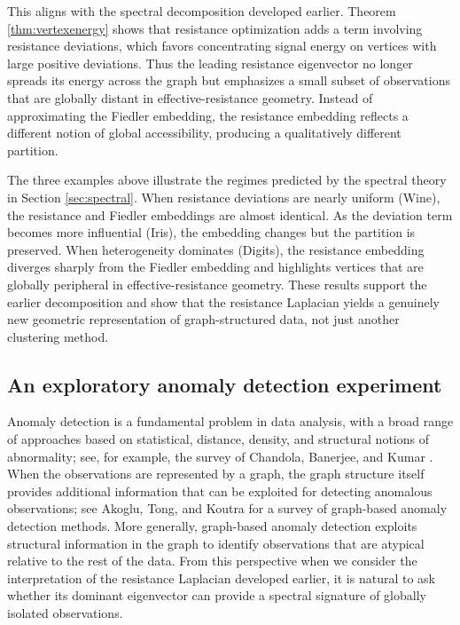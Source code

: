 \documentclass[12pt,a4paper]{amsart}
\theoremstyle{remark}
\theoremstyle{definition}
\newcommand{\1}{\mathbf{1}}
\newcommand{\0}{\mathbf{0}}
\begin{document}
This aligns with the spectral decomposition developed earlier. 
Theorem \ref{thm:vertexenergy} shows that resistance optimization adds a term involving resistance deviations, which favors concentrating signal energy on vertices with large positive deviations. 
Thus the leading resistance eigenvector no longer spreads its energy across the graph but emphasizes a small subset of observations that are globally distant in effective-resistance geometry. 
Instead of approximating the Fiedler embedding, the resistance embedding reflects a different notion of global accessibility, producing a qualitatively different partition.

The three examples above illustrate the regimes predicted by the spectral theory in Section \ref{sec:spectral}. 
When resistance deviations are nearly uniform (Wine), the resistance and Fiedler embeddings are almost identical. 
As the deviation term becomes more influential (Iris), the embedding changes but the partition is preserved. 
When heterogeneity dominates (Digits), the resistance embedding diverges sharply from the Fiedler embedding and highlights vertices that are globally peripheral in effective-resistance geometry. 
These results support the earlier decomposition and show that the resistance Laplacian yields a genuinely new geometric representation of graph-structured data, not just another clustering method.

\subsection{An exploratory anomaly detection experiment}
Anomaly detection is a fundamental problem in data analysis, with a broad range of approaches based on statistical, distance, density, and structural notions of abnormality; see, for example, the survey of Chandola, Banerjee, and Kumar \cite{Chandola2009}.
When the observations are represented by a graph, the graph structure itself provides additional information that can be exploited for detecting anomalous observations; see Akoglu, Tong, and Koutra \cite{Akoglu2015} for a survey of graph-based anomaly detection methods. 
More generally, graph-based anomaly detection exploits structural information in the graph to identify observations that are atypical relative to the rest of the data.
From this perspective when we consider the interpretation of the resistance Laplacian developed earlier, it is natural to ask whether its dominant eigenvector can provide a spectral signature of globally isolated observations.
\end{document}
